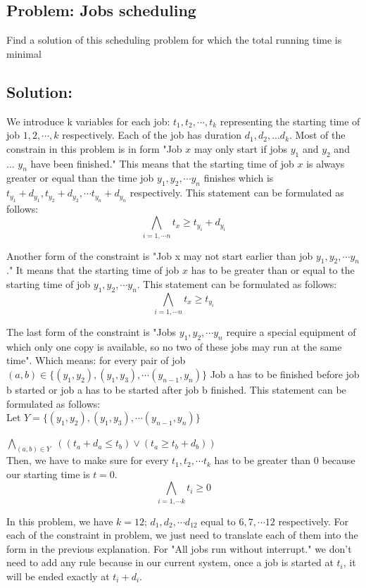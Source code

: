 \documentclass[12pt]{article}
\begin{document}
\subsection*{Problem: Jobs scheduling}
Find a solution of this scheduling problem for which the total running time is minimal

\subsection*{Solution:}
We introduce k variables for each job: $t_1, t_2, \cdots , t_{k}$ representing the starting time of job $1, 2, \cdots, k$ respectively. Each of the job has duration $d_1, d_2, ... d_{k}$. Most of the constrain in this problem is in form "Job $x$ may only start if jobs $y_1$ and $y_2$ and ... $y_n$ have been finished." This means that the starting time of job $x$ is always greater or equal than the time job $y_1, y_2, \cdots y_n$ finishes which is $t_{y_1}+d_{y_1}, t_{y_2}+d_{y_2}, \cdots t_{y_n}+d_{y_n}$ respectively. This statement can be formulated as follows:
\[ \bigwedge_{i=1,\cdots n} t_x \geq t_{y_i}+d_{y_i} \]

Another form of the constraint is "Job x may not start earlier than job $y_1, y_2, \cdots y_n$." It means that the starting time of job $x$ has to be greater than or equal to the starting time of job $y_1, y_2, \cdots y_n$. This statement can be formulated as follows:
\[ \bigwedge_{i=1,\cdots n} t_x \geq t_{y_i} \]

The last form of the constraint is "Jobs $y_1, y_2, \cdots y_n$ require a special equipment of which only one copy is available, so no two of these jobs may run at the same time". Which means: for every pair of job $(a,b) \in \{(y_1, y_2), (y_1, y_3), \cdots (y_{n-1}, y_{n})\}$ Job a has to be finished before job b started or job a has to be started after job b finished. This statement can be formulated as follows:
\\
Let $Y=\{(y_1, y_2), (y_1, y_3), \cdots (y_{n-1}, y_{n})\}$

   { $\bigwedge_{(a,b) \in Y}$} $((t_a + d_a \leq t_b) \vee (t_a \geq t_b+d_b) )$
   \\


Then, we have to make sure for every $t_1, t_2, \cdots t_k$ has to be greater than 0 because our starting time is $t=0$. \[\bigwedge_{i=1, \cdots k} t_i \geq 0\]

In this problem, we have $k=12$; $d_1, d_2, \cdots d_{12}$ equal to $6, 7, \cdots 12$ respectively. For each of the constraint in problem, we just need to translate each of them into the form in the previous explanation. For "All jobs run without interrupt." we don't need to add any rule because in our current system, once a job is started at $t_i$, it will be ended exactly at $t_i+d_i$.
\end{document}
